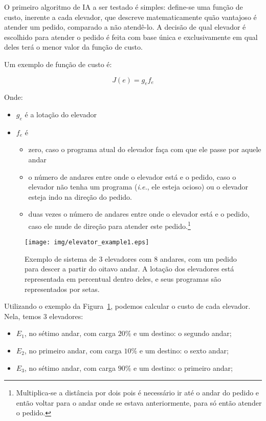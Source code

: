 O primeiro algoritmo de IA a ser testado é simples: define-se uma
função de custo, inerente a cada elevador, que descreve matematicamente quão
vantajoso é atender um pedido, comparado a não atendê-lo. A decisão de qual
elevador é escolhido para atender o pedido é feita com base única e
exclusivamente em qual deles terá o menor valor da função de custo.

Um exemplo de função de custo é:

\[
  J(e) = g_{e}f_{e}
\]

Onde:
\begin{itemize}
\item \textbf{$g_{e}$} é a lotação do elevador
\item \textbf{$f_{e}$} é
  \begin{itemize}
    \item zero, caso o programa atual do elevador faça com que ele passe por
      aquele andar
    \item o número de andares entre onde o elevador está e o pedido, caso o
      elevador não tenha um programa (\textit{i.e.}, ele esteja ocioso) ou o
      elevador esteja indo na direção do pedido.
    \item duas vezes o número de andares entre onde o elevador está e o pedido,
      caso ele mude de direção para atender este pedido.\footnote{Multiplica-se
        a distância por dois pois é necessário ir até o andar do pedido e então
        voltar para o andar onde se estava anteriormente, para só então atender
        o pedido.}
  \end{itemize}
\end{itemize}

\begin{figure}[htb!]
  \centering
  \texttt{[image: img/elevator\_example1.eps]}
  \caption{Exemplo de sistema de 3 elevadores com 8 andares, com um pedido para
    descer a partir do oitavo andar. A lotação dos elevadores está representada
    em percentual dentro deles, e seus programas são representados por setas.}
  \label{fig:elevadores-1}
\end{figure}

Utilizando o exemplo da Figura~\ref{fig:elevadores-1}, podemos calcular o custo
de cada elevador. Nela, temos 3 elevadores:

\begin{itemize}
\item \textbf{$E_{1}$}, no sétimo andar, com carga $20\%$ e um destino: o segundo andar;
\item \textbf{$E_{2}$}, no primeiro andar, com carga $10\%$ e um destino: o sexto andar;
\item \textbf{$E_{3}$}, no sétimo andar, com carga $90\%$ e um destino: o primeiro andar;
\end{itemize}

